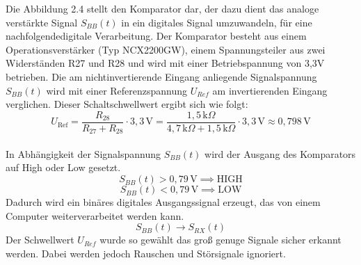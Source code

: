 Die Abbildung 2.4 stellt den Komparator dar, der dazu dient das analoge verstärkte Signal $S_{BB}(t)$ in ein digitales Signal umzuwandeln, für
eine nachfolgendedigitale Verarbeitung. Der Komparator besteht aus einem Operationsverstärker (Typ NCX2200GW), einem Spannungsteiler aus zwei Widerständen
R27 und R28 und wird mit einer Betriebspannung von 3,3V betrieben. Die am nichtinvertierende Eingang anliegende Signalspannung $S_{BB}(t)$ wird mit
einer Referenzspannung $U_{Ref}$ am invertierenden Eingang verglichen. Dieser Schaltschwellwert ergibt sich wie folgt:
\\
\begin{equation}
    U_{\text{Ref}} = \frac{R_{28}}{R_{27} + R_{28}} \cdot 3{,}3\,\text{V}
    = \frac{1{,}5\,\text{k}\Omega}{4{,}7\,\text{k}\Omega + 1{,}5\,\text{k}\Omega} \cdot 3{,}3\,\text{V}
    \approx 0{,}798\,\text{V}
\end{equation}\\
In Abhängigkeit der Signalspannung $S_{BB}(t)$ wird der Ausgang des Komparators auf High oder Low gesetzt.
\[
S_{BB}(t) > 0{,}79\,\mathrm{V} \implies \text{HIGH}
\]
\[
S_{BB}(t) < 0{,}79\,\mathrm{V} \implies \text{LOW}
\]
Dadurch wird ein binäres digitales Ausgangssignal erzeugt, das von einem Computer weiterverarbeitet werden kann.
\[
S_{BB}(t) \rightarrow S_{RX}(t)
\]
Der Schwellwert $U_{Ref}$ wurde so gewählt das groß genuge Signale sicher erkannt werden. Dabei werden jedoch Rauschen und Störsignale ignoriert.